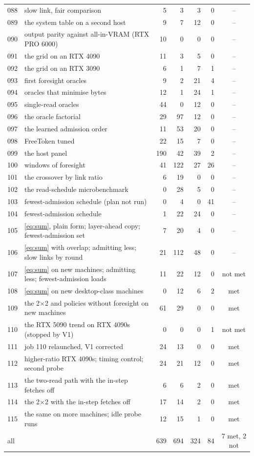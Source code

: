 \begin{table}[p]
\begin{tabular}{@{}llrrrrc@{}}
088 & slow link, fair comparison & 5 & 3 & 3 & 0 & -- \\
089 & the system table on a second host & 9 & 7 & 12 & 0 & -- \\
090 & output parity against all-in-VRAM (RTX PRO 6000) & 10 & 0 & 0 & 0 & -- \\
091 & the grid on an RTX 4090 & 11 & 3 & 5 & 0 & -- \\
092 & the grid on an RTX 3090 & 6 & 1 & 7 & 1 & -- \\
093 & first foresight oracles & 9 & 2 & 21 & 4 & -- \\
094 & oracles that minimise bytes & 12 & 1 & 24 & 1 & -- \\
095 & single-read oracles & 44 & 0 & 12 & 0 & -- \\
096 & the oracle factorial & 29 & 97 & 12 & 0 & -- \\
097 & the learned admission order & 11 & 53 & 20 & 0 & -- \\
098 & FreeToken tuned & 22 & 15 & 7 & 0 & -- \\
099 & the host panel & 190 & 42 & 39 & 2 & -- \\
100 & windows of foresight & 41 & 122 & 27 & 26 & -- \\
101 & the crossover by link ratio & 6 & 19 & 0 & 0 & -- \\
102 & the read-schedule microbenchmark & 0 & 28 & 5 & 0 & -- \\
103 & fewest-admission schedule (plan not run) & 0 & 4 & 0 & 41 & -- \\
104 & fewest-admission schedule & 1 & 22 & 24 & 0 & -- \\
105 & \cref{eq:sum}, plain form; layer-ahead copy; fewest-admission set & 7 & 20 & 4 & 0 & -- \\
106 & \cref{eq:sum} with overlap; admitting less; slow links by round & 21 & 112 & 48 & 0 & -- \\
107 & \cref{eq:sum} on new machines; admitting less; fewest-admission loads & 11 & 22 & 12 & 0 & not met \\
108 & \cref{eq:sum} on new desktop-class machines & 0 & 12 & 6 & 2 & met \\
109 & the 2$\times$2 and policies without foresight on new machines & 61 & 29 & 0 & 0 & met \\
110 & the RTX 5090 trend on RTX 4090s (stopped by V1) & 0 & 0 & 0 & 1 & not met \\
111 & job 110 relaunched, V1 corrected & 24 & 13 & 0 & 0 & met \\
112 & higher-ratio RTX 4090s; timing control; second probe & 24 & 21 & 12 & 0 & met \\
113 & the two-read path with the in-step fetches off & 6 & 6 & 2 & 0 & met \\
114 & the 2$\times$2 with the in-step fetches off & 17 & 14 & 2 & 0 & met \\
115 & the same on more machines; idle probe runs & 12 & 15 & 1 & 0 & met \\
\midrule all & & 639 & 694 & 324 & 84 & 7 met, 2 not \\
\bottomrule\end{tabular}\end{table}
